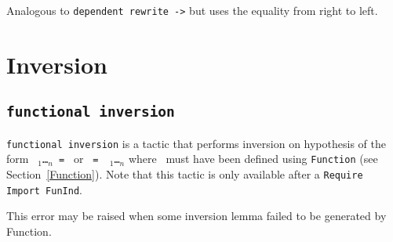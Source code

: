 \begin{coq_example*}
\begin{Variants}
Analogous to {\tt dependent rewrite ->} but uses the equality from
right to left.
\end{Variants}

\section{Inversion
\label{inversion}}

\subsection{\tt functional inversion \ident}
\label{sec:functional-inversion}

\texttt{functional inversion} is a tactic
that performs inversion on hypothesis {\ident} of the form
\texttt{\qualid\ \term$_1$\dots\term$_n$\ = \term} or \texttt{\term\ =
  \qualid\ \term$_1$\dots\term$_n$} where \qualid\ must have been
defined using \texttt{Function} (see Section~\ref{Function}).
Note that this tactic is only available after a {\tt Require Import FunInd}.

\begin{ErrMsgs}
\item {}

\item {}

  This error may be raised when  some inversion lemma failed to be
  generated by Function.
\end{ErrMsgs}





\end{coq_example*}
